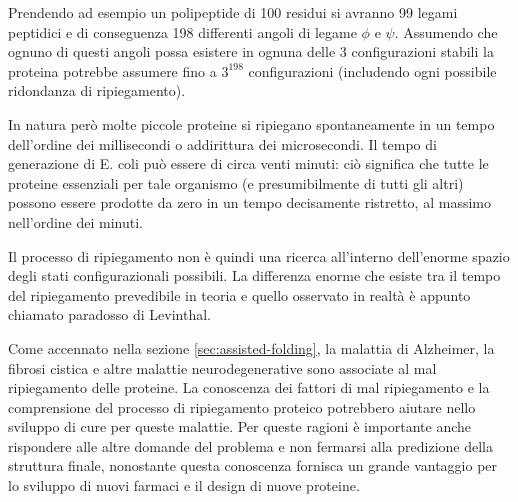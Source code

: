 { \par Prendendo ad esempio un polipeptide di 100 residui si avranno 99 legami peptidici e di conseguenza 198 differenti angoli di legame $\phi$ e $\psi$. Assumendo che ognuno di questi angoli possa esistere in ognuna delle 3 configurazioni stabili la proteina potrebbe assumere fino a $3^{198}$ configurazioni (includendo ogni possibile ridondanza di ripiegamento).
 
\par In natura però molte piccole proteine si ripiegano spontaneamente in un tempo dell'ordine dei millisecondi o addirittura dei microsecondi. Il tempo di generazione di E. coli può essere di circa venti minuti: ciò significa che tutte le proteine essenziali per tale organismo (e presumibilmente di tutti gli altri) possono essere prodotte da zero in un tempo decisamente ristretto, al massimo nell'ordine dei minuti.

\par Il processo di ripiegamento non è quindi una ricerca all'interno dell'enorme spazio degli stati configurazionali possibili. La differenza enorme che esiste tra il tempo del ripiegamento prevedibile in teoria e quello osservato in realtà è appunto chiamato paradosso di Levinthal. \\

\par Come accennato nella sezione \ref{sec:assisted-folding}, la malattia di Alzheimer, la fibrosi cistica e altre malattie neurodegenerative sono associate al mal ripiegamento delle proteine. La conoscenza dei fattori di mal ripiegamento e la comprensione del processo di ripiegamento proteico potrebbero aiutare nello sviluppo di cure per queste malattie. Per queste ragioni è importante anche rispondere alle altre domande del problema e non fermarsi alla predizione della struttura finale, nonostante questa conoscenza fornisca un grande vantaggio per lo sviluppo di nuovi farmaci e il design di nuove proteine.
}
\clearpage